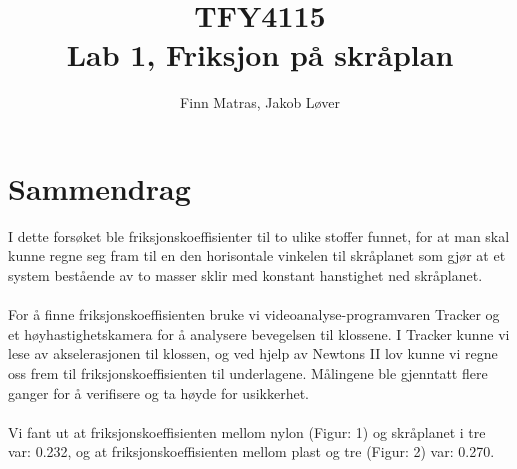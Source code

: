 \documentclass[10pt,a4paper]{report}
\author{Finn Matras, Jakob Løver}
\title{{\LARGE TFY4115}\\{\large Lab 1, Friksjon på skråplan}}
\begin{document}
\renewcommand{\contentsname}{Innhold}
\renewcommand{\cftchapleader}{\cftdotfill{\cftdotsep}}
\renewcommand{\cftpartleader}{\cftdotfill{\cftdotsep}}

\maketitle
\tableofcontents

\chapter*{Sammendrag}
I dette forsøket ble friksjonskoeffisienter til to ulike stoffer funnet, for at man skal kunne regne seg fram til en den horisontale vinkelen til skråplanet som gjør at et system bestående av to masser sklir med konstant hanstighet ned skråplanet.\\
\\For å finne friksjonskoeffisienten bruke vi videoanalyse-programvaren Tracker og et høyhastighetskamera for å analysere bevegelsen til klossene. I Tracker kunne vi lese av akselerasjonen til klossen, og ved hjelp av Newtons II lov kunne vi regne oss frem til friksjonskoeffisienten til underlagene. Målingene ble gjenntatt flere ganger for å verifisere og ta høyde for usikkerhet.\\
\\Vi fant ut at friksjonskoeffisienten mellom nylon (Figur: 1) og skråplanet i tre var: 0.232, og at friksjonskoeffisienten mellom plast og tre (Figur: 2) var: 0.270.
\end{document}
